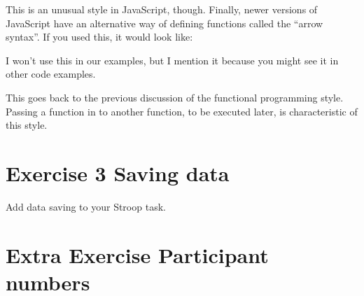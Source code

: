 \documentclass[letterpaper,10pt,english]{sphinxmanual}
\begin{document}
\begin{sphinxVerbatim}[commandchars=\\\{\}]
  

     \PYG{p}{[}\PYG{p}{]}
     
\end{sphinxVerbatim}

This is an unusual style in JavaScript, though. Finally, newer versions of
JavaScript have an alternative way of defining
functions called the “arrow syntax”. If you used this, it would look like:

\begin{sphinxVerbatim}[commandchars=\\\{\}]
     \PYG{p}{[}\PYG{p}{]}
         
\end{sphinxVerbatim}

I won’t use this in our examples, but I mention it because you might see it in
other code examples.

This goes back to the previous discussion of the functional programming style.
Passing a function in to another function, to be executed later, is
characteristic of this style.


\section{Exercise 3 \textendash{} Saving data}
\label{\detokenize{jspsych_au:exercise-3-saving-data}}
Add data saving to your Stroop task.



\section{Extra Exercise \sphinxhyphen{} Participant numbers}
\label{\detokenize{jspsych_au:extra-exercise-participant-numbers}}
\end{document}
